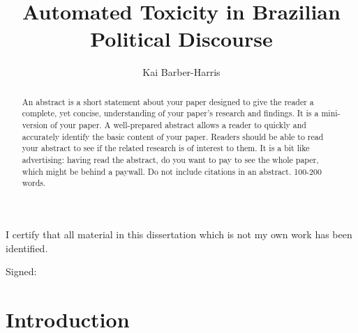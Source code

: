 \documentclass[a4paper,11pt]{article}  %
\title{Automated Toxicity in Brazilian Political Discourse}
\author{Kai Barber-Harris}
\date{}   %
\begin{document}
	
	\maketitle
	
	\begin{abstract}
		An abstract is a short statement about your paper designed to give the reader a complete, yet 
		concise, understanding of your paper's research and findings. It is a mini-version of your paper.
		A well-prepared abstract allows a reader to quickly and accurately identify the basic content of 
		your paper. Readers should be able to read your abstract to see if the related research is of 
		interest to them.  It is a bit like advertising: having read the abstract, do you want to pay to see the
		whole paper, which might be behind a paywall.
		Do not include citations in an abstract.  100-200 words.
	\end{abstract}
	
	\vfill
	
	\begin{center}
		I certify that all material in this dissertation which is not my own work has been identified.
	\end{center}
	
	\vspace{5mm}
	
	Signed: 
	
	\vspace{50mm}
	
	\newpage
	\section{Introduction}
	\label{sec:intro}
	
	
	\newpage
	\printbibliography
	
\end{document}
